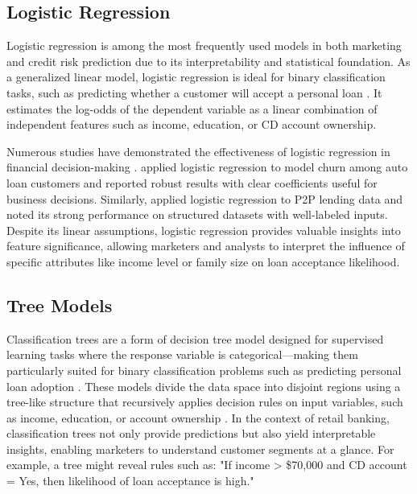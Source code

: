 \documentclass[12pt]{article}
\begin{document}
\subsection{Logistic Regression}
Logistic regression is among the most frequently used models in both marketing and credit risk prediction due to its interpretability and statistical foundation\citep{Chen2023InterpretableRisk}. As a generalized linear model, logistic regression is ideal for binary classification tasks, such as predicting whether a customer will accept a personal loan \citep{deWaal2024ConsumersLearning}. It estimates the log-odds of the dependent variable as a linear combination of independent features such as income, education, or CD account ownership.

Numerous studies have demonstrated the effectiveness of logistic regression in financial decision-making \citep{AlonsoRobisco2022MeasuringPrediction}. \cite{Valluri2022CustomerTechniques} applied logistic regression to model churn among auto loan customers and reported robust results with clear coefficients useful for business decisions. Similarly, \cite{deWaal2024ConsumersLearning} applied logistic regression to P2P lending data and noted its strong performance on structured datasets with well-labeled inputs. Despite its linear assumptions, logistic regression provides valuable insights into feature significance, allowing marketers and analysts to interpret the influence of specific attributes like income level or family size on loan acceptance likelihood.

\subsection{Tree Models}
Classification trees are a form of decision tree model designed for supervised learning tasks where the response variable is categorical—making them particularly suited for binary classification problems such as predicting personal loan adoption \citep{Momparler2016BankingApproach}. These models divide the data space into disjoint regions using a tree-like structure that recursively applies decision rules on input variables, such as income, education, or account ownership \citep{Safarkhani2021ImprovingTree}. In the context of retail banking, classification trees not only provide predictions but also yield interpretable insights, enabling marketers to understand customer segments at a glance. For example, a tree might reveal rules such as: "If income > \$70,000 and CD account = Yes, then likelihood of loan acceptance is high."
\end{document}

